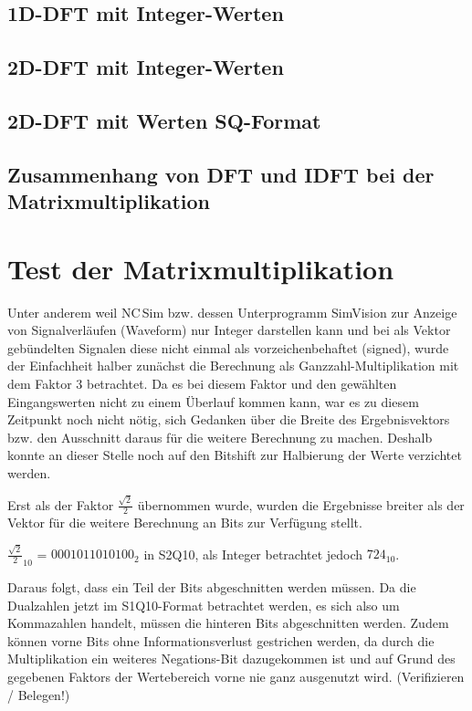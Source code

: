 \subsection{1D-DFT mit Integer-Werten}
 
\subsection{2D-DFT mit Integer-Werten}

\subsection{2D-DFT mit Werten SQ-Format}

\subsection{Zusammenhang von DFT und IDFT bei der Matrixmultiplikation}

\section{Test der Matrixmultiplikation}
Unter anderem weil NC\,Sim bzw. dessen Unterprogramm SimVision zur Anzeige von Signalverläufen (Waveform) nur Integer darstellen kann und bei als Vektor gebündelten Signalen 
diese nicht einmal als vorzeichenbehaftet (signed), wurde der Einfachheit halber zunächst die Berechnung als Ganzzahl-Multiplikation mit dem Faktor 3 betrachtet. 
Da es bei diesem Faktor und den gewählten Eingangswerten nicht zu einem 
Überlauf kommen kann, war es zu diesem Zeitpunkt noch nicht nötig, sich Gedanken über die Breite des Ergebnisvektors bzw. den Ausschnitt daraus für die weitere
Berechnung zu machen. Deshalb konnte an dieser Stelle noch auf den Bitshift zur Halbierung der Werte verzichtet werden.

Erst als der Faktor $\frac{\sqrt{2}}{2}$ übernommen wurde, wurden die Ergebnisse breiter als der Vektor für die weitere Berechnung an Bits zur Verfügung stellt.

${\frac{\sqrt{2}}{2}}_{10}$ = $0001011010100_2$ in S2Q10, als Integer betrachtet jedoch $724_{10}$.

Daraus folgt, dass ein Teil der Bits abgeschnitten werden müssen. Da die Dualzahlen jetzt im S1Q10-Format betrachtet werden, es sich also um Kommazahlen handelt,
müssen die hinteren Bits abgeschnitten werden. Zudem können vorne Bits ohne Informationsverlust gestrichen werden, da durch die Multiplikation ein weiteres 
Negations-Bit dazugekommen ist und auf Grund des gegebenen Faktors der Wertebereich vorne nie ganz ausgenutzt wird. (Verifizieren / Belegen!)


